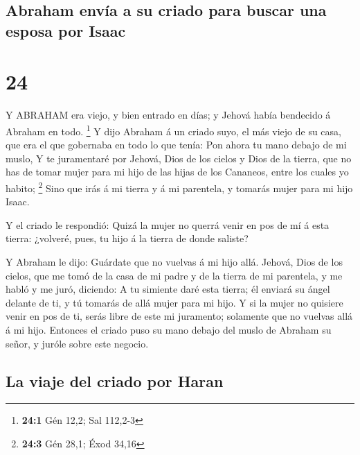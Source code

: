 \hypertarget{abraham-envuxeda-a-su-criado-para-buscar-una-esposa-por-isaac}{%
\subsection{Abraham envía a su criado para buscar una esposa por
Isaac}\label{abraham-envuxeda-a-su-criado-para-buscar-una-esposa-por-isaac}}

\hypertarget{section-23}{%
\section{24}\label{section-23}}

 Y ABRAHAM era viejo, y bien entrado en días; y Jehová había
bendecido á Abraham en todo. \footnote{\textbf{24:1} Gén 12,2; Sal
  112,2-3}  Y dijo Abraham á un criado suyo, el más viejo de
su casa, que era el que gobernaba en todo lo que tenía: Pon ahora tu
mano debajo de mi muslo,  Y te juramentaré por Jehová, Dios
de los cielos y Dios de la tierra, que no has de tomar mujer para mi
hijo de las hijas de los Cananeos, entre los cuales yo habito;
\footnote{\textbf{24:3} Gén 28,1; Éxod 34,16}  Sino que irás
á mi tierra y á mi parentela, y tomarás mujer para mi hijo Isaac.

 Y el criado le respondió: Quizá la mujer no querrá venir en
pos de mí á esta tierra: ¿volveré, pues, tu hijo á la tierra de donde
saliste?

 Y Abraham le dijo: Guárdate que no vuelvas á mi hijo allá.
 Jehová, Dios de los cielos, que me tomó de la casa de mi
padre y de la tierra de mi parentela, y me habló y me juró, diciendo: A
tu simiente daré esta tierra; él enviará su ángel delante de ti, y tú
tomarás de allá mujer para mi hijo.  Y si la mujer no
quisiere venir en pos de ti, serás libre de este mi juramento; solamente
que no vuelvas allá á mi hijo.  Entonces el criado puso su
mano debajo del muslo de Abraham su señor, y juróle sobre este negocio.

\hypertarget{la-viaje-del-criado-por-haran}{%
\subsection{La viaje del criado por
Haran}\label{la-viaje-del-criado-por-haran}}

